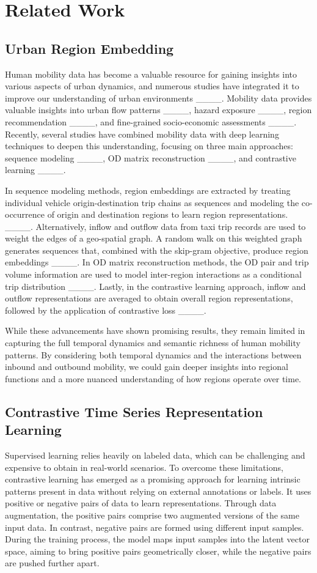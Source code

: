 \section{Related Work}
\subsection{Urban Region Embedding}
Human mobility data has become a valuable resource for gaining insights into various aspects of urban dynamics, and numerous studies have integrated it to improve our understanding of urban environments ____. Mobility data provides valuable insights into urban flow patterns ____, hazard exposure ____, region recommendation ____, and fine-grained socio-economic assessments ____. Recently, several studies have combined mobility data with deep learning techniques to deepen this understanding, focusing on three main approaches: sequence modeling ____, OD matrix reconstruction ____, and contrastive learning ____.

In sequence modeling methods, region embeddings are extracted by treating individual vehicle origin-destination trip chains as sequences and modeling the co-occurrence of origin and destination regions to learn region representations. ____. Alternatively, inflow and outflow data from taxi trip records are used to weight the edges of a geo-spatial graph. A random walk on this weighted graph generates sequences that, combined with the skip-gram objective, produce region embeddings ____. In OD matrix reconstruction methods, the OD pair and trip volume information are used to model inter-region interactions as a conditional trip distribution ____. Lastly, in the contrastive learning approach, inflow and outflow representations are averaged to obtain overall region representations, followed by the application of contrastive loss ____. 

While these advancements have shown promising results, they remain limited in capturing the full temporal dynamics and semantic richness of human mobility patterns. By considering both temporal dynamics and the interactions between inbound and outbound mobility, we could gain deeper insights into regional functions and a more nuanced understanding of how regions operate over time.

\subsection{Contrastive Time Series Representation Learning}
 Supervised learning relies heavily on labeled data, which can be challenging and expensive to obtain in real-world scenarios. To overcome these limitations, contrastive learning has emerged as a promising approach for learning intrinsic patterns present in data without relying on external annotations or labels. It uses positive or negative pairs of data to learn representations. Through data augmentation, the positive pairs comprise two augmented versions of the same input data. In contrast, negative pairs are formed using different input samples. During the training process, the model maps input samples into the latent vector space, aiming to bring positive pairs geometrically closer, while the negative pairs are pushed further apart. 
 
